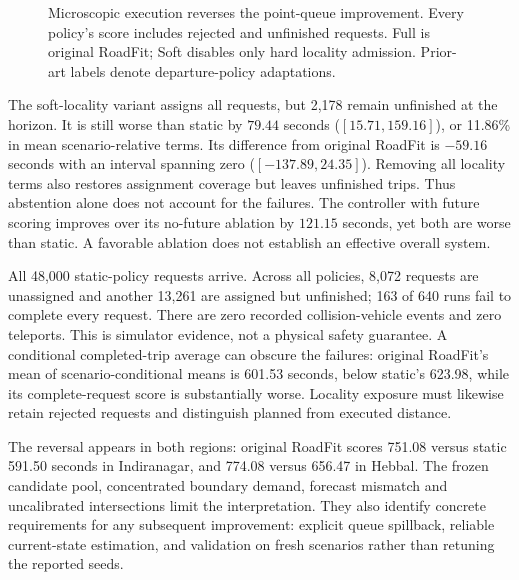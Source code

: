 \documentclass[sigconf,anonymous,review]{acmart}
\begin{document}
\begin{figure}[t]
\centering
{}
\caption{Microscopic execution reverses the point-queue improvement. Every policy's score includes rejected and unfinished requests. Full is original RoadFit; Soft disables only hard locality admission. Prior-art labels denote departure-policy adaptations.}
\end{figure}

The soft-locality variant assigns all requests, but 2,178 remain unfinished at the horizon. It is still worse than static by $79.44$ seconds ($[15.71,159.16]$), or 11.86\% in mean scenario-relative terms. Its difference from original RoadFit is $-59.16$ seconds with an interval spanning zero ($[-137.89,24.35]$). Removing all locality terms also restores assignment coverage but leaves unfinished trips. Thus abstention alone does not account for the failures. The controller with future scoring improves over its no-future ablation by $121.15$ seconds, yet both are worse than static. A favorable ablation does not establish an effective overall system.

All 48,000 static-policy requests arrive. Across all policies, 8,072 requests are unassigned and another 13,261 are assigned but unfinished; 163 of 640 runs fail to complete every request. There are zero recorded collision-vehicle events and zero teleports. This is simulator evidence, not a physical safety guarantee. A conditional completed-trip average can obscure the failures: original RoadFit's mean of scenario-conditional means is 601.53 seconds, below static's 623.98, while its complete-request score is substantially worse. Locality exposure must likewise retain rejected requests and distinguish planned from executed distance.

The reversal appears in both regions: original RoadFit scores 751.08 versus static 591.50 seconds in Indiranagar, and 774.08 versus 656.47 in Hebbal. The frozen candidate pool, concentrated boundary demand, forecast mismatch and uncalibrated intersections limit the interpretation. They also identify concrete requirements for any subsequent improvement: explicit queue spillback, reliable current-state estimation, and validation on fresh scenarios rather than retuning the reported seeds.
\end{document}
